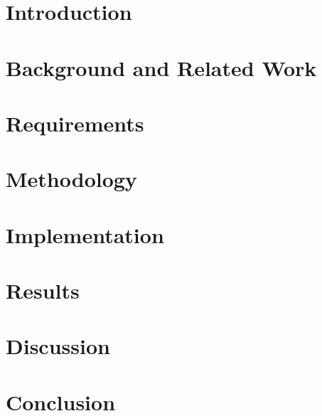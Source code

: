 



\newpage

\newpage


\clearpage

\tableofcontents
\listoffigures
\listoftables
\lstlistoflistings

\newpage

\chapter{Introduction}


\chapter{Background and Related Work}


\chapter{Requirements}

\chapter{Methodology}


\chapter{Implementation}


\chapter{Results}


\chapter{Discussion}


\chapter{Conclusion}






